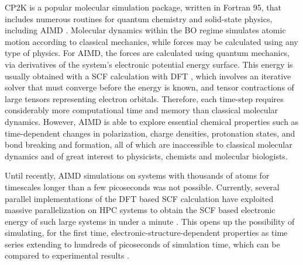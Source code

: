 CP2K \cite{hutter2014cp2k} is a popular molecular simulation package, written in Fortran 95, that includes numerous routines for quantum chemistry and solid-state physics, including \ac{AIMD} \cite{marx2009ab}.
Molecular dynamics within the \ac{BO} regime simulates atomic motion according to classical mechanics, while forces may be calculated using any type of physics.
For \ac{AIMD}, the forces are calculated using quantum mechanics, via derivatives of the system's electronic potential energy surface.
This energy is usually obtained with a \ac{SCF} calculation with \ac{DFT} \cite{vandevondele2012linear,hutter2014cp2k}, which involves an iterative solver that must converge before the energy is known, and tensor contractions of large tensors representing electron orbitals.
Therefore, each time-step requires considerably more computational time and memory than classical molecular dynamics.
However, \ac{AIMD} is able to explore essential chemical properties such as time-dependent changes in polarization, charge densities, protonation states, and bond breaking and formation, all of which are inaccessible to classical molecular dynamics and of great interest to physicists, chemists and molecular biologists.

Until recently, \ac{AIMD} simulations on systems with thousands of atoms for timescales longer than a few picoseconds was not possible.
Currently, several parallel implementations of the \ac{DFT} based \ac{SCF} calculation have exploited massive parallelization on \acs{HPC} systems to obtain the \ac{SCF} based electronic energy of such large systems in under a minute \cite{vasp_bench,kresse1996efficient,cp2k_bench,vandevondele2012linear}.
This opens up the possibility of simulating, for the first time, electronic-structure-dependent properties as time series extending to hundreds of picoseconds of simulation time, which can be compared to experimental results \cite{gillan2016perspective, pestana2017ab, hassanali2013proton, milovanovic2018new, sellner2013charge}.

